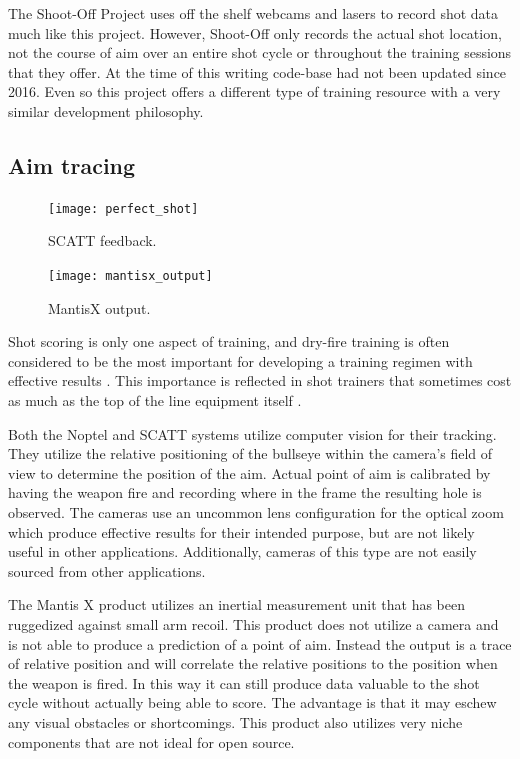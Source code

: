 \documentclass[conference]{IEEEtran}
\begin{document}
The Shoot-Off Project \cite{shootoff} uses off the shelf webcams and lasers to record shot data much like this project.
However, Shoot-Off only records the actual shot location, not the course of aim over an entire shot cycle or throughout the training sessions that they offer.
At the time of this writing code-base had not been updated since 2016.
Even so this project offers a different type of training resource with a very similar development philosophy.

\subsection{Aim tracing}

\begin{figure}[]
	\centering
	\texttt{[image: perfect\_shot]}
	\caption{SCATT \cite{scatt} feedback.}
	\label{fig:SCATT_Example}
\end{figure}

\begin{figure}[]
	\centering
	\texttt{[image: mantisx\_output]}
	\caption{MantisX \cite{mantisx} output.}
	\label{fig:MantisX_Example}
\end{figure}

Shot scoring is only one aspect of training, and dry-fire training is often 
considered to be the most important for developing a training regimen with effective results \cite{Potter2017}.
This importance is reflected in shot trainers that sometimes cost as much as the top of the line equipment itself
\cite{scatt, noptel}.

Both the Noptel and SCATT systems utilize computer vision for their tracking.
They utilize the relative positioning of the bullseye within the camera's field of view to determine the position of the aim.
Actual point of aim is calibrated by having the weapon fire and recording where in the frame the resulting hole is observed.
The cameras use an uncommon lens configuration for the optical zoom which produce effective results for their intended purpose, but are not likely useful in other applications.
Additionally, cameras of this type are not easily sourced from other applications.

The Mantis X \cite{mantisx} product utilizes an inertial measurement unit that has been ruggedized against small arm recoil. 
This product does not utilize a camera and is not able to produce a prediction of a point of aim.
Instead the output is a trace of relative position and will correlate the relative positions to the position when the weapon is fired.
In this way it can still produce data valuable to the shot cycle without actually being able to score.
The advantage is that it may eschew any visual obstacles or shortcomings.
This product also utilizes very niche components that are not ideal for open source.
\end{document}
